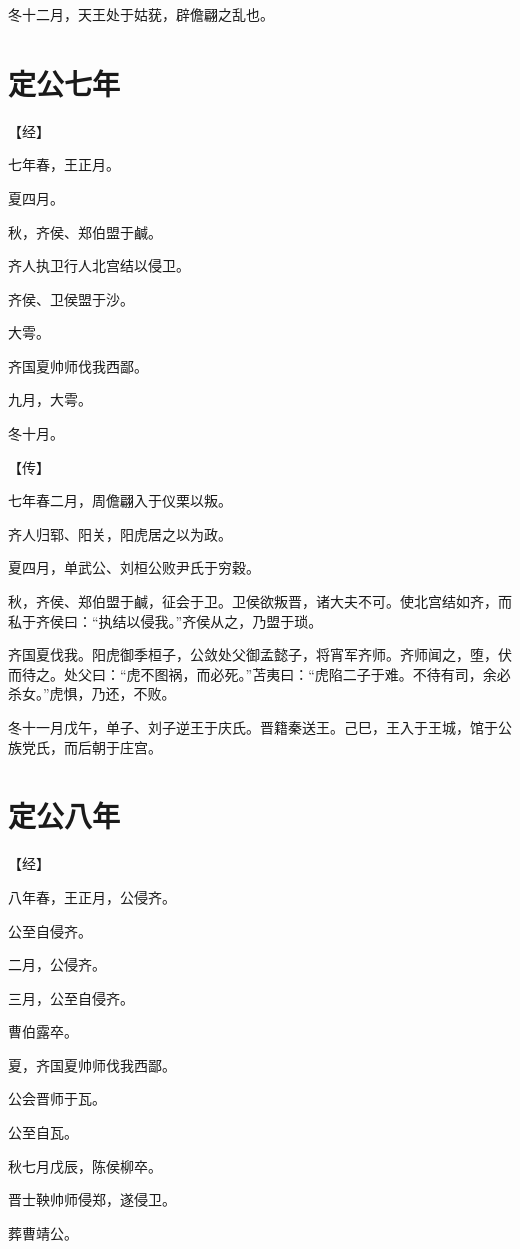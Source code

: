 \documentclass[a4paper,12pt,UTF8,twoside]{ctexbook}
\begin{document}
冬十二月，天王处于姑莸，辟儋翩之乱也。

\section{定公七年}



【经】

七年春，王正月。

夏四月。

秋，齐侯、郑伯盟于鹹。

齐人执卫行人北宫结以侵卫。

齐侯、卫侯盟于沙。

大雩。

齐国夏帅师伐我西鄙。

九月，大雩。

冬十月。

【传】

七年春二月，周儋翩入于仪栗以叛。

齐人归郓、阳关，阳虎居之以为政。

夏四月，单武公、刘桓公败尹氏于穷穀。

秋，齐侯、郑伯盟于鹹，征会于卫。卫侯欲叛晋，诸大夫不可。使北宫结如齐，而私于齐侯曰：“执结以侵我。”齐侯从之，乃盟于琐。

齐国夏伐我。阳虎御季桓子，公敛处父御孟懿子，将宵军齐师。齐师闻之，堕，伏而待之。处父曰：“虎不图祸，而必死。”苫夷曰：“虎陷二子于难。不待有司，余必杀女。”虎惧，乃还，不败。

冬十一月戊午，单子、刘子逆王于庆氏。晋籍秦送王。己巳，王入于王城，馆于公族党氏，而后朝于庄宫。


\section{定公八年}




【经】

八年春，王正月，公侵齐。

公至自侵齐。

二月，公侵齐。

三月，公至自侵齐。

曹伯露卒。

夏，齐国夏帅师伐我西鄙。

公会晋师于瓦。

公至自瓦。

秋七月戊辰，陈侯柳卒。

晋士鞅帅师侵郑，遂侵卫。

葬曹靖公。
\end{document}
